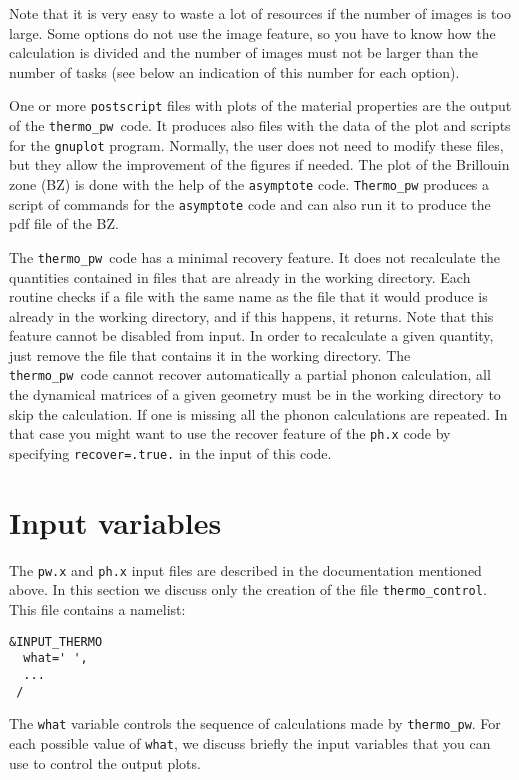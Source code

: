 \documentclass[12pt,a4paper]{article}
\def\thermo{\texttt{thermo\_pw}}
\begin{document}
Note that it is very easy to waste a lot of resources if the number of 
images is too large. Some options do not use the image feature, so you have
to know how the calculation is divided and the number of images must not
be larger than the number of tasks (see below an indication of this number
for each option).

One or more \texttt{postscript} files with plots of the material properties
are the output of the \thermo\ code. It produces also files with the data of 
the plot and scripts for the \texttt{gnuplot} program. 
Normally, the user does not need to modify these files, but they allow 
the improvement of the figures if needed.
The plot of the Brillouin zone (BZ) is done with the help of the 
\texttt{asymptote} code. \texttt{Thermo\_pw} produces a script of commands
for the \texttt{asymptote} code and can also run it to produce the pdf
file of the BZ.

The \thermo\ code has a minimal recovery feature. It does not recalculate
the quantities contained in files that are already in the working
directory. Each routine checks if a file with the same name
as the file that it would produce is already in the working directory,
and if this happens, it returns. Note that this feature cannot be 
disabled from input. In order to recalculate a given quantity, just remove
the file that contains it in the working directory.
The \thermo\ code cannot recover automatically a partial phonon calculation, all 
the dynamical matrices of a given geometry must be in the working directory to 
skip the calculation. If one is missing all the phonon calculations are repeated. 
In that case you might want to use the recover feature  of the \texttt{ph.x} code 
by specifying \texttt{recover=.true.} in the input of this code.

\section{Input variables}

The \texttt{pw.x} and \texttt{ph.x} input files are described in the documentation
mentioned above. In this section we discuss only the creation of the file
\texttt{thermo\_control}. This file contains a namelist:  
\begin{verbatim}
&INPUT_THERMO
  what=' ',
  ...
 /
\end{verbatim}
The \texttt{what} variable controls the sequence of calculations made
by \thermo. For each possible value of \texttt{what}, we discuss briefly the
input variables that you can use to control the output plots.
\end{document}
